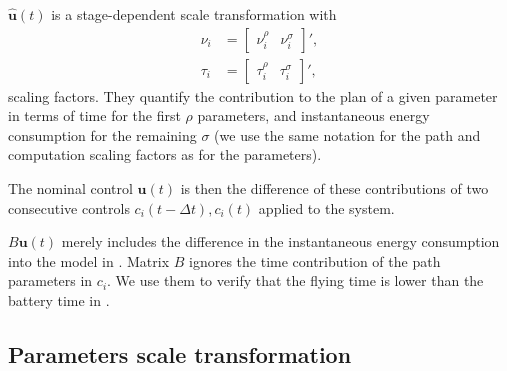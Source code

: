 $\hat{\mathbf{u}}(t)$ is a stage-dependent scale transformation with 
\begin{subequations}\label{eq:scaling}\begin{align}
\nu_i&=\begin{bmatrix}\nu_i^\rho & \nu_i^\sigma\end{bmatrix}',\\ 
\tau_i&=\begin{bmatrix}\tau_i^\rho & \tau_i^\sigma\end{bmatrix}',
\end{align}\end{subequations}
scaling factors. They quantify the contribution to the plan of a given parameter in terms of time for the first $\rho$ parameters, and instantaneous energy consumption for the remaining $\sigma$ (we use the same notation for the path and computation scaling factors as for the parameters). 

The nominal control $\mathbf{u}(t)$ is then the difference of these contributions of two consecutive controls $c_i(t-\Delta t),c_i(t)$ applied to the system. 

$B\mathbf{u}(t)$ merely includes the difference in the instantaneous energy consumption into the model in . Matrix $B$ ignores the time contribution of the path parameters in $c_i$. We use them to verify that the flying time is lower than the battery time in .

\subsection{Parameters scale transformation}
\label{sec:merging}

%  
%  


